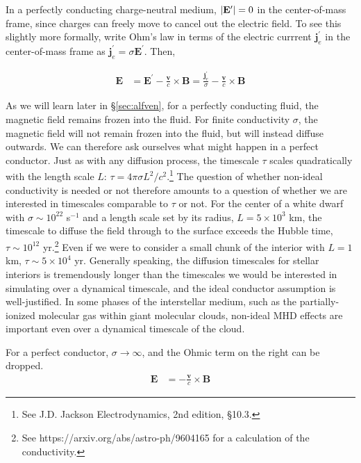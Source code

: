 \documentclass[notoc]{tufte-handout}
\renewcommand{\vec}[1]{
\mathbf{#1}
}
\newcommand{\E}{
\vec{E}
}
\newcommand{\B}{
\vec{B}
}
\begin{document}
In a perfectly conducting charge-neutral medium, $\abs{\E^\prime}=0$ in the center-of-mass frame, since charges can freely move to cancel out the electric field.  To see this slightly more formally, write Ohm's law in terms of the electric currrent $\vec {j}_e^\prime$ in the center-of-mass frame as $\vec {j}^\prime_e = \sigma \vec {E}^\prime$. Then, 

\begin{align}
\E & = \E^\prime - \frac{\vec{v} }{c}\times \B = \frac{\vec{j}_e^\prime}{\sigma} - \frac{\vec{v}}{c}\times \B 
\end{align}

As we will learn later in \S \ref {sec:alfven},  for a perfectly conducting fluid, the magnetic field remains frozen into the fluid. For finite conductivity $\sigma$, the magnetic field will not remain frozen into the fluid, but will instead diffuse outwards. We can therefore ask ourselves what might happen in a perfect conductor. Just as with any diffusion process, the timescale $\tau$ scales quadratically with the length scale $L$: $\tau = 4 \pi \sigma L^2 / c^2$.\footnote {See J.D. Jackson Electrodynamics, 2nd edition, \S 10.3.} The question of whether non-ideal conductivity is needed or not therefore amounts to a question of whether we are interested in timescales comparable to $\tau$ or not. %
For the center of a white dwarf with $\sigma \sim 10^{22}$ s$^{-1}$ and a length scale set by its radius, $L = 5 \times 10^3$ km, the timescale to diffuse the field through to the surface exceeds the Hubble time, $\tau \sim 10^{12}$ yr.\footnote {See https://arxiv.org/abs/astro-ph/9604165 for a calculation of the conductivity.} Even if we were to consider a small chunk of the interior with $L = 1 $ km, $\tau \sim 5 \times 10^4$ yr. Generally speaking, the diffusion timescales for stellar interiors is tremendously longer than the timescales we would be interested in simulating over a dynamical timescale, and the ideal conductor assumption is well-justified. In some phases of the interstellar medium, such as  the partially-ionized molecular gas within giant molecular clouds, non-ideal MHD effects are important even over a dynamical timescale of the cloud.

 For a perfect conductor, $\sigma\to \infty$, and the Ohmic term on the right can be dropped.
\begin{align}
    \E & = - \frac{\vec{v}}{c} \times \B 
\end{align}
\end{document}
